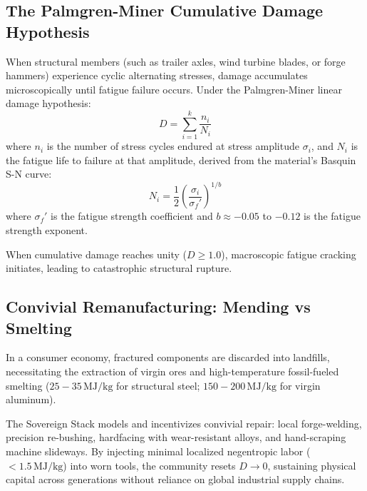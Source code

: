 \subsection{The Palmgren-Miner Cumulative Damage Hypothesis}
When structural members (such as trailer axles, wind turbine blades, or forge hammers) experience cyclic alternating stresses, damage accumulates microscopically until fatigue failure occurs. Under the Palmgren-Miner linear damage hypothesis:
\begin{equation}
D = \sum_{i=1}^{k} \frac{n_i}{N_i}
\label{eq:palmgren_miner}
\end{equation}
where $n_i$ is the number of stress cycles endured at stress amplitude $\sigma_i$, and $N_i$ is the fatigue life to failure at that amplitude, derived from the material's Basquin S-N curve:
\begin{equation}
N_i = \frac{1}{2} \left( \frac{\sigma_i}{\sigma_f'} \right)^{1/b}
\label{eq:basquin_fatigue_life}
\end{equation}
where $\sigma_f'$ is the fatigue strength coefficient and $b \approx -0.05$ to $-0.12$ is the fatigue strength exponent.

When cumulative damage reaches unity ($D \ge 1.0$), macroscopic fatigue cracking initiates, leading to catastrophic structural rupture.

\subsection{Convivial Remanufacturing: Mending vs Smelting}
In a consumer economy, fractured components are discarded into landfills, necessitating the extraction of virgin ores and high-temperature fossil-fueled smelting ($25 - 35\,\mathrm{MJ/kg}$ for structural steel; $150 - 200\,\mathrm{MJ/kg}$ for virgin aluminum). 

The Sovereign Stack models and incentivizes convivial repair: local forge-welding, precision re-bushing, hardfacing with wear-resistant alloys, and hand-scraping machine slideways. By injecting minimal localized negentropic labor ($<1.5\,\mathrm{MJ/kg}$) into worn tools, the community resets $D \to 0$, sustaining physical capital across generations without reliance on global industrial supply chains.

